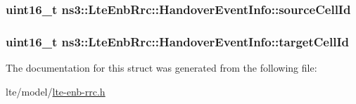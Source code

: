 \subsubsection[{\texorpdfstring{source\+Cell\+Id}{sourceCellId}}]{\setlength{\rightskip}{0pt plus 5cm}uint16\+\_\+t ns3\+::\+Lte\+Enb\+Rrc\+::\+Handover\+Event\+Info\+::source\+Cell\+Id}\hypertarget{structns3_1_1LteEnbRrc_1_1HandoverEventInfo_aa80dfd7a49d448f8aaed3e568c8eb1d5}{}\label{structns3_1_1LteEnbRrc_1_1HandoverEventInfo_aa80dfd7a49d448f8aaed3e568c8eb1d5}
\subsubsection[{\texorpdfstring{target\+Cell\+Id}{targetCellId}}]{\setlength{\rightskip}{0pt plus 5cm}uint16\+\_\+t ns3\+::\+Lte\+Enb\+Rrc\+::\+Handover\+Event\+Info\+::target\+Cell\+Id}\hypertarget{structns3_1_1LteEnbRrc_1_1HandoverEventInfo_a5782b9cc9dd2f0b1b0037442b1c8ccfe}{}\label{structns3_1_1LteEnbRrc_1_1HandoverEventInfo_a5782b9cc9dd2f0b1b0037442b1c8ccfe}


The documentation for this struct was generated from the following file\+:\begin{DoxyCompactItemize}
\item 
lte/model/\hyperlink{lte-enb-rrc_8h}{lte-\/enb-\/rrc.\+h}\end{DoxyCompactItemize}
